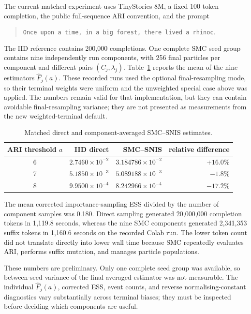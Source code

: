 \documentclass[11pt,a4paper]{article}
\newcommand{\1}{\mathbb I}
\begin{document}
The current matched experiment uses TinyStories-8M, a fixed 100-token
completion, the public full-sequence ARI convention, and the prompt
\begin{quote}
\texttt{Once upon a time, in a big forest, there lived a rhinoc}.
\end{quote}
The IID reference contains 200,000 completions. One complete SMC seed group
contains nine independently run components, with 256 final particles per
component and different pairs $(C_j,\lambda_j)$. Table~\ref{tab:direct-smc}
reports the mean of the nine estimators $\widehat F_j(a)$.
These recorded runs used the optional final-resampling mode, so their terminal
weights were uniform and the unweighted special case above was applied. The
numbers remain valid for that implementation, but they can contain avoidable
final-resampling variance; they are not presented as measurements from the new
weighted-terminal default.

\begin{table}[h]
\centering
\begin{tabular}{c r r r}
\hline
ARI threshold $a$ & IID direct & SMC--SNIS & relative difference \\
\hline
6 & $2.7460\times10^{-2}$ & $3.184786\times10^{-2}$ & $+16.0\%$ \\
7 & $5.1850\times10^{-3}$ & $5.089188\times10^{-3}$ & $-1.8\%$ \\
8 & $9.9500\times10^{-4}$ & $8.242966\times10^{-4}$ & $-17.2\%$ \\
\hline
\end{tabular}
\caption{Matched direct and component-averaged SMC--SNIS estimates.}
\label{tab:direct-smc}
\end{table}

The mean corrected importance-sampling ESS divided by the number of component
samples was 0.180. Direct sampling generated 20,000,000 completion tokens in
1,119.8 seconds, whereas the nine SMC components generated 2,341,353 suffix
tokens in 1,160.6 seconds on the recorded Colab run. The lower token count did
not translate directly into lower wall time because SMC repeatedly evaluates
ARI, performs suffix mutation, and manages particle populations.

These numbers are preliminary. Only one complete seed group was available,
so between-seed variance of the final averaged estimator was not measurable.
The individual $\widehat F_j(a)$, corrected ESS, event counts, and reverse
normalising-constant diagnostics vary substantially across terminal biases;
they must be inspected before deciding which components are useful.
\end{document}
